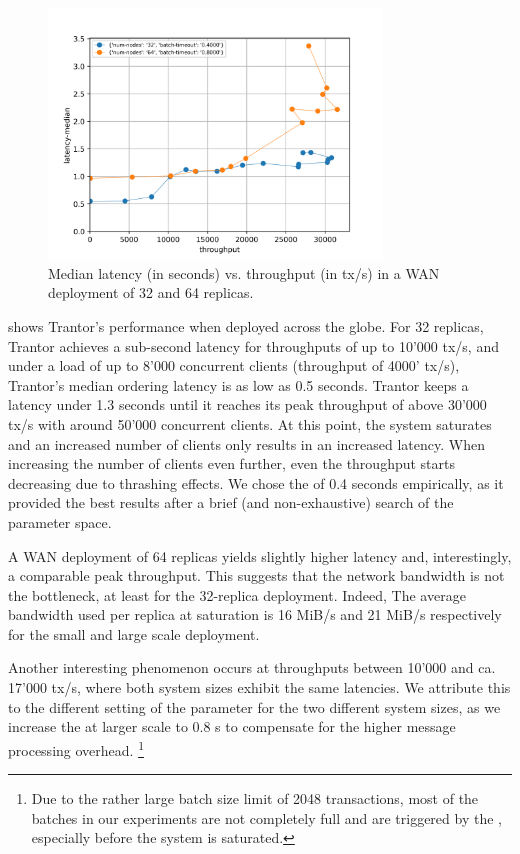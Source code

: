 \documentclass{article}
\begin{document}
\begin{figure}
    \centering
    \includegraphics[width=0.79\textwidth]{figures/results-wan-final.png}
    \caption{\centering Median latency (in seconds) vs. throughput (in tx/s)\newline
    in a WAN deployment of 32 and 64 replicas.}
    \label{fig:eval-wan}
\end{figure}

 shows Trantor's performance when deployed across the globe.
For 32 replicas, Trantor achieves a sub-second latency for throughputs of up to 10'000 tx/s,
and under a load of up to 8'000 concurrent clients (throughput of 4000' tx/s), Trantor's median ordering latency is as low as 0.5 seconds.
Trantor keeps a latency under 1.3 seconds until it reaches its peak throughput of above 30'000 tx/s with around 50'000 concurrent clients.
At this point, the system saturates and an increased number of clients only results in an increased latency.
When increasing the number of clients even further, even the throughput starts decreasing due to thrashing effects.
We chose the  of 0.4 seconds empirically,
as it provided the best results after a brief (and non-exhaustive) search of the parameter space.

A WAN deployment of 64 replicas yields slightly higher latency and, interestingly, a comparable peak throughput.
This suggests that the network bandwidth is not the bottleneck, at least for the 32-replica deployment.
Indeed, The average bandwidth used per replica at saturation is 16 MiB/s and 21 MiB/s respectively for the small and large scale deployment.

Another interesting phenomenon occurs at throughputs between 10'000 and ca. 17'000 tx/s, where both system sizes exhibit the same latencies.
We attribute this to the different setting of the  parameter for the two different system sizes,
as we increase the  at larger scale to 0.8 s to compensate for the higher message processing overhead.%
\footnote{Due to the rather large batch size limit of 2048 transactions,
most of the batches in our experiments are not completely full and are triggered by the , especially before the system is saturated.}
\end{document}
